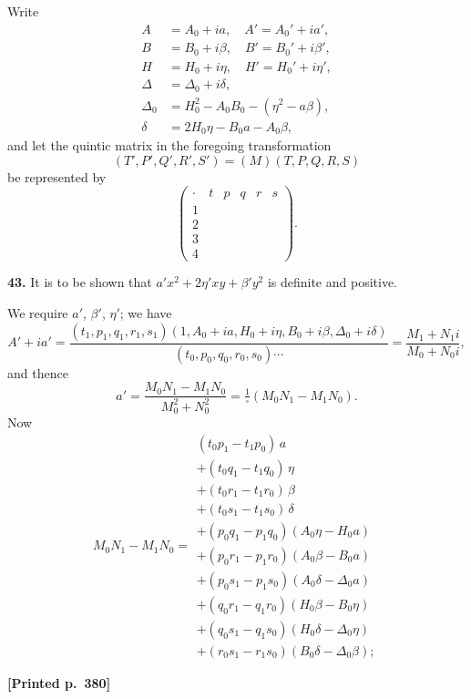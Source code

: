 \documentclass[11pt]{article}
\begin{document}
Write
\begin{align*}
A &= A_{0}+ia,\quad A' = A_{0}'+ia',\\
B &= B_{0}+i\beta,\quad B' = B_{0}'+i\beta',\\
H &= H_{0}+i\eta,\quad H' = H_{0}'+i\eta',\\
\Delta &= \Delta_{0}+i\delta,\\
\Delta_{0} &= H_{0}^{2}-A_{0}B_{0}-(\eta^{2}-a\beta),\\
\delta &= 2H_{0}\eta-B_{0}a-A_{0}\beta,
\end{align*}
and let the quintic matrix in the foregoing transformation
\[
(T',P',Q',R',S')=(M)(T,P,Q,R,S)
\]
be represented by
\[
\begin{pmatrix}
\cdot & t & p & q & r & s\\
1 & & & & & \\
2 & & & & & \\
3 & & & & & \\
4 & & & & &
\end{pmatrix}.
\]

\medskip
\noindent\textbf{43.} It is to be shown that $a'x^{2}+2\eta'xy+\beta'y^{2}$ is definite and positive.

We require $a'$, $\beta'$, $\eta'$; we have
\[
A'+ia'=\frac{(t_{1},p_{1},q_{1},r_{1},s_{1})(1,A_{0}+ia,H_{0}+i\eta,B_{0}+i\beta,\Delta_{0}+i\delta)}{(t_{0},p_{0},q_{0},r_{0},s_{0})\cdots}=\frac{M_{1}+N_{1}i}{M_{0}+N_{0}i},
\]
and thence
\[
a'=\frac{M_{0}N_{1}-M_{1}N_{0}}{M_{0}^{2}+N_{0}^{2}}=\tfrac{1}{\square}(M_{0}N_{1}-M_{1}N_{0}).
\]
Now
\[
M_{0}N_{1}-M_{1}N_{0}=\begin{array}{ll}
(t_{0}p_{1}-t_{1}p_{0})\,a\\
+(t_{0}q_{1}-t_{1}q_{0})\,\eta\\
+(t_{0}r_{1}-t_{1}r_{0})\,\beta\\
+(t_{0}s_{1}-t_{1}s_{0})\,\delta\\
+(p_{0}q_{1}-p_{1}q_{0})(A_{0}\eta-H_{0}a)\\
+(p_{0}r_{1}-p_{1}r_{0})(A_{0}\beta-B_{0}a)\\
+(p_{0}s_{1}-p_{1}s_{0})(A_{0}\delta-\Delta_{0}a)\\
+(q_{0}r_{1}-q_{1}r_{0})(H_{0}\beta-B_{0}\eta)\\
+(q_{0}s_{1}-q_{1}s_{0})(H_{0}\delta-\Delta_{0}\eta)\\
+(r_{0}s_{1}-r_{1}s_{0})(B_{0}\delta-\Delta_{0}\beta);
\end{array}
\]

\medskip
\noindent\textbf{[Printed p.~380]}\hfill
\end{document}
